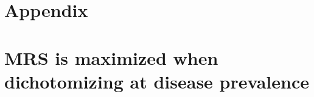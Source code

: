 \documentclass[11pt]{article}
\begin{document}
% 
% 
% 
% 
% 
% 







\appendix 
\section*{Appendix}
\label{Appendix}

\section*{MRS is maximized when dichotomizing at disease prevalence}
\label{maxMRSNBIatPrevalence}
\end{document}
